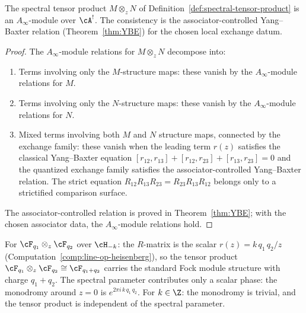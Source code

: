\begin{proposition}
The spectral tensor product $M\otimes_z N$
of Definition~\textup{\ref{def:spectral-tensor-product}}
is an $A_\infty$-module over $\cA^!$. The consistency
is the associator-controlled Yang--Baxter relation
(Theorem~\textup{\ref{thm:YBE}}) for the chosen local exchange datum.
\end{proposition}

\begin{proof}
The $A_\infty$-module relations for $M\otimes_z N$
decompose into:
\begin{enumerate}[label=(\roman*)]
\item Terms involving only the $M$-structure maps:
 these vanish by the $A_\infty$-module relations for $M$.
\item Terms involving only the $N$-structure maps:
 these vanish by the $A_\infty$-module relations for $N$.
\item Mixed terms involving both $M$ and $N$ structure
 maps, connected by the exchange family: these vanish when
 the leading term \(r(z)\) satisfies the classical Yang--Baxter
 equation
 \([r_{12},r_{13}]+[r_{12},r_{23}]+[r_{13},r_{23}]=0\)
 and the quantized exchange family satisfies the
 associator-controlled Yang--Baxter relation. The strict equation
 \(R_{12}R_{13}R_{23}=R_{23}R_{13}R_{12}\) belongs only to a
 strictified comparison surface.
\end{enumerate}
The associator-controlled relation is proved in
Theorem~\ref{thm:YBE}; with the chosen associator data, the
$A_\infty$-module relations hold.
\end{proof}

\begin{computation}
For $\cF_{q_1}\otimes_z\cF_{q_2}$ over $\cH_{-k}$:
the $R$-matrix is the scalar $r(z)=k\,q_1\,q_2/z$
(Computation~\ref{comp:line-op-heisenberg}), so the
tensor product $\cF_{q_1}\otimes_z\cF_{q_2}
\cong\cF_{q_1+q_2}$
carries the standard Fock module structure with charge
$q_1+q_2$. The spectral parameter contributes only a
scalar phase: the monodromy around $z=0$ is
$e^{2\pi i\,k\,q_1\,q_2}$. For $k\in\Z$: the
monodromy is trivial, and the tensor product is
independent of the spectral parameter.
\end{computation}


